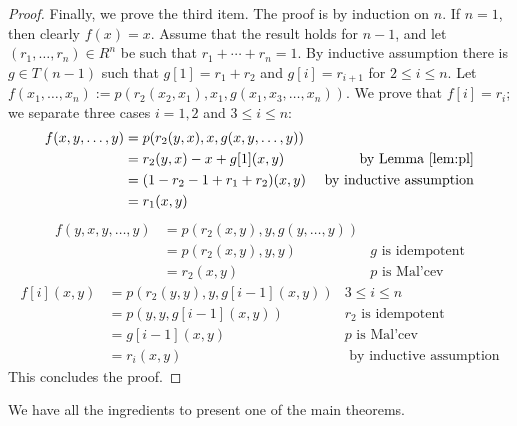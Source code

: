 \documentclass{amsart}
\numberwithin{equation}{section}
\theoremstyle{plain}
\theoremstyle{definition}
\begin{document}
\begin{proof}
  Finally, we prove the third item. 
  The proof is by induction on $n$. 
  If $n=1$, then clearly $f(x)=x$. 
  Assume that the result holds for $n-1$, and let $(r_1, \ldots, r_n) \in R^n$ be such that $r_1 + \cdots +r_n=1$. 
  By inductive assumption there is $g \in T(n-1)$ such that $g[1]=r_1 + r_2$ and $g[i]=r_{i+1}$ for $2 \le i \le n$.
  Let $f(x_1, \ldots, x_n):=p(r_2(x_2,x_1),x_1,g(x_1,x_3,\ldots,x_n))$. 
  We prove that $f[i]=r_i$; we separate three cases $i=1,2$ and $3 \le i \le n$:  
  \begin{align*}
    f(x,y,\ldots,y) & = p(r_2(y,x),x,g(x,y,\ldots,y)) & \\
    & = r_2(y,x) -x +g[1](x,y) & \text{ by Lemma \ref{lem:pl}}\\
    & = (1-r_2 -1+r_1+r_2)(x,y) & \text{ by inductive assumption} \\
    & = r_1(x,y)
  \end{align*} 
  \begin{align*} 
    f(y,x,y,\ldots,y) & = p(r_2(x,y),y,g(y, \ldots, y)) & \\
    & = p(r_2(x,y),y,y) & g \text{ is idempotent}\\
    & = r_2(x,y) & p \text{ is Mal'cev} 
  \end{align*}
  \begin{align*}
    f[i](x,y) & = p(r_2(y,y),y,g[i-1](x,y)) & 3 \le i \le n \\
    & = p(y,y,g[i-1](x,y)) & r_2 \text{ is idempotent} \\
    & = g[i-1](x,y) & p \text{ is Mal'cev} \\
    & = r_i(x,y) & \text{ by inductive assumption} 
  \end{align*}
  This concludes the proof. 
\end{proof}

We have all the ingredients to present one of the main theorems. 
\end{document}
